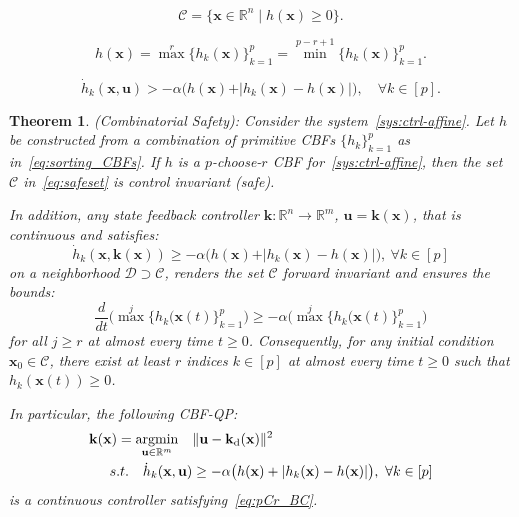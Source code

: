 \documentclass[10pt,a4paper]{amsart}
\newtheorem{theorem}{Theorem}
\newcommand{\Cc}{\mathcal{C}}
\newcommand{\Dc}{\mathcal{D}}
\DeclareMathOperator*{\argmin}{argmin}
\newcommand{\bk}{\mathbf{k}}
\newcommand{\bu}{\mathbf{u}}
\newcommand{\bx}{\mathbf{x}}
\newcommand{\des}{{\operatorname{d}}}
\newcommand{\longthmtitle}[1]{\mbox{}{\textit{(#1):}}}
\newcommand{\map}[3]{#1:#2 \rightarrow #3}
\newcommand{\real}{\mathbb{R}}
\newcommand{\setdefb}[2]{\big\{#1 \; | \; #2\big\}}
\newcommand{\until}[1]{[#1]}
\begin{document}
\begin{equation}\label{eq:safeset}
    \Cc = \setdefb{\bx\in\real^n}{h(\bx)\geq 0}.    
\end{equation}

\begin{equation}\label{eq:sorting_CBFs}
    h(\bx)  = \max^r \{h_k(\bx)\}_{k=1}^p = \min^{p-r+1} \{h_k(\bx)\}_{k=1}^p.
\end{equation}

   \begin{equation}
    \dot h_k(\bx,\bu) > -\alpha \big( h(\bx)+\vert h_k(\bx)-h(\bx)\vert \big), \quad \forall k\in\until{p}.
    \label{eq:c-cbf}
    \end{equation}

\begin{theorem}\longthmtitle{Combinatorial Safety}
\label{thm:pCr_safety}
    Consider the system~\eqref{sys:ctrl-affine}.
    Let $h$ be constructed from a combination of primitive CBFs $\{h_k\}_{k=1}^p$ as in~\eqref{eq:sorting_CBFs}. If $h$ is a $p$-choose-$r$ CBF for~\eqref{sys:ctrl-affine}, then the set $\Cc$ in~\eqref{eq:safeset} is control invariant (safe).
    
    In addition, any state feedback controller ${\map{\bk}{\real^n}{\real^m}}$,  ${\bu=\bk(\bx)}$, that is continuous and satisfies:
    \begin{equation}
        \label{eq:pCr_BC}
    \dot h_k(\bx,\bk(\bx)) \geq -\alpha \big( h(\bx)+\vert h_k(\bx)-h(\bx)\vert \big), ~\forall k\in\until{p} 
    \end{equation}
    on a neighborhood ${\Dc\supset\Cc}$, renders the set $\Cc$ forward invariant and ensures the bounds:
    \begin{equation}\label{eq:pCr_bound}
        \frac{d}{dt} \big(\max^j\{h_k(\bx(t)\}_{k=1}^p\big) \geq -\alpha\big(\max^j\{h_k(\bx(t)\}_{k=1}^p\big)
    \end{equation}
    for all ${j \geq r}$  at almost every time $t\geq 0$. Consequently, for any initial condition~${\bx_0\in\Cc}$, there exist at least $r$ indices ${k\in \until{p}}$ at almost every time ${t\geq 0}$ such that ${h_k(\bx(t))\geq 0}$.

    In particular, the following CBF-QP:
    \begin{align}\label{eq:pCr-CBF-QP}
    \bk(\bx)  =\argmin_{\bu\in\real^m} \quad & \|\bu-\bk_\des(\bx)\|^2                                                                  \\
             \textup{s.t.} \quad  \dot h_k(\bx,\bu) &\geq -\alpha \big( h(\bx)+\vert h_k(\bx)-h(\bx)\vert \big), ~\forall k\in\until{p} \nonumber
    \end{align}
    is a continuous controller satisfying~\eqref{eq:pCr_BC}.
\end{theorem}
\end{document}
